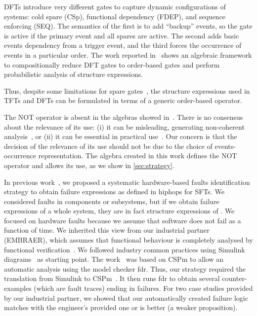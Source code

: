 \documentclass[en,twoside,onehalfspacing,phd]{risethesis}
\newcommand{\EMBRAER}{EMBRAER\xspace}
\newcommand{\simulink}{Simulink\xspace}
\begin{document}
\Acp{DFT} introduce very different gates to capture dynamic configurations of systems: cold spare (\acs{CSp}), functional dependency (\acs{FDEP}), and sequence enforcing (\acs{SEQ}).
The semantics of the first is to add ``backup'' events, so the gate is active if the primary event and all spares are active.
The second adds basic events dependency from a trigger event, and the third forces the occurrence of events in a particular order.
The work reported in~\cite{MRL2011} shows an algebraic framework to compositionally reduce \ac{DFT} gates to order-based gates and perform probabilistic analysis of structure expressions.

Thus, despite some limitations for spare gates~\cite{MRL2014}, the structure expressions used in \acp{TFT} and \acp{DFT} can be formulated in terms of a generic order-based operator.

The NOT operator is absent in the algebras showed in~\cite{WP2009,Walker2009,Merle2010,MRL2011b}.
There is no consensus about the relevance of its use: (i) it can be misleading, generating non-coherent analysis~\cite{Oliv2006}, or (ii) it can be essential in practical use~\cite{Andrews2001}.
Our concern is that the decision of the relevance of its use should not be due to the choice of events-occurrence representation.
The algebra created in this work defines the NOT operator and allows its use, as we show in \cref{sec:strategy}.

In previous work~\cite{Didier2012,DM2012}, we proposed a systematic hardware-based faults identification strategy to obtain failure expressions as defined in \acs{hiphops} for \acp{SFT}.
We considered faults in components or subsystems, but if we obtain failure expressions of a whole system, they are in fact structure expressions of .
%
%
We focused on hardware faults because we assume that software does not fail as a function of time.
%
We inherited this view from our industrial partner (\EMBRAER), which assumes that functional behaviour is completely analysed by functional verification~\cite{SP2011}.
%
We followed industry common practices using \simulink diagrams~\cite{Nise1992} as starting point.
%
The work~\cite{DM2012} was based on \ac{CSPm} to allow an automatic analysis using the model checker \acs{fdr}.
%
Thus, our strategy required the translation from \simulink to \ac{CSPm}~\cite{JMS+2011}.
%
It then runs \acs{fdr} to obtain several counter-examples (which are fault traces) ending in failures.
%
For two case studies provided by our industrial partner, we showed that our automatically created failure logic matches with the engineer's provided one or is better (a weaker proposition).
\end{document}
